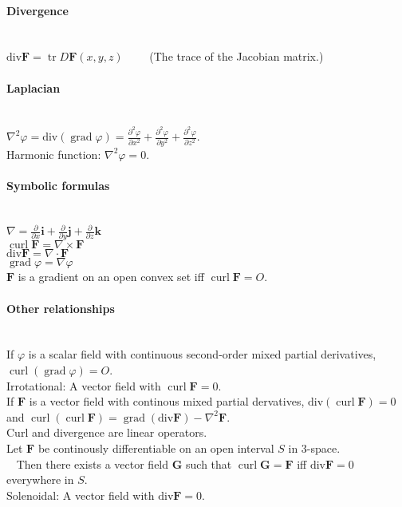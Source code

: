 \documentclass[10pt]{article}
\DeclareMathOperator{\curl}{curl}
\DeclareMathOperator{\tr}{tr}
\DeclareMathOperator{\grad}{grad}
\newcommand{\bs}[1]{\pmb{#1}}
\newcommand{\parfrac}[2]{\frac{\partial #1}{\partial #2}}
\begin{document}
\paragraph{Divergence}\ \\
$\text{div} \bs{F} = \tr D\bs{F}(x, y, z) \qquad$ (The trace of the Jacobian matrix.)

\paragraph{Laplacian}\ \\
$\nabla^2 \varphi = \text{div}(\grad \varphi) = \frac{\partial^2\varphi}{\partial x^2}+\frac{\partial^2\varphi}{\partial y^2}+\frac{\partial^2\varphi}{\partial z^2}$.\\
Harmonic function: $\nabla^2\varphi = 0$.

\paragraph{Symbolic formulas}\ \\
$\nabla = \parfrac{}{x}\bs{i} + \parfrac{}{y}\bs{j} + \parfrac{}{z}\bs{k}$\\
$\curl \bs{F} = \nabla \times \bs{F}$\\
$\text{div} \bs{F} = \nabla \cdot \bs{F}$\\
$\grad \varphi = \nabla \varphi$\\
$\bs{F}$ is a gradient on an open convex set iff $\curl \bs{F} = O$.

\paragraph{Other relationships}\ \\
If $\varphi$ is a scalar field with continuous second-order mixed partial derivatives, $\curl(\grad \varphi) = O$.\\
Irrotational: A vector field with $\curl \bs{F} = 0$.\\
If $\bs{F}$ is a vector field with continous mixed partial dervatives, $\text{div}(\curl \bs{F}) = 0$ and $\curl(\curl \bs{F}) = \grad(\text{div} \bs{F}) - \nabla^2 \bs{F}$.\\
Curl and divergence are linear operators.\\
Let $\bs{F}$ be continously differentiable on an open interval $S$ in 3-space.\\
$\phantom{x}$ Then there exists a vector field $\bs{G}$ such that $\curl \bs{G} = \bs{F}$ iff $\text{div} \bs{F} = 0$ everywhere in $S$.\\
Solenoidal: A vector field with $\text{div} \bs{F} = 0$.
\end{document}
